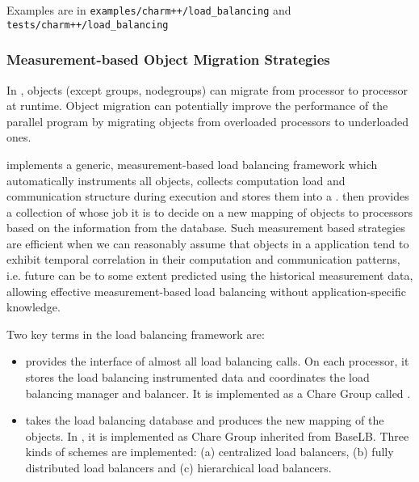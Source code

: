 Examples are in {\tt examples/charm++/load\_balancing} and {\tt
  tests/charm++/load\_balancing}
\subsubsection{Measurement-based Object Migration Strategies}

\label{lbFramework}
\label{migrationlb}

In \charmpp{}, objects (except groups, nodegroups) can migrate from 
processor to processor at runtime. Object migration can potentially 
improve the performance of the parallel program by migrating objects from 
overloaded processors to underloaded ones. 


 \charmpp{} implements a generic, measurement-based load balancing framework
which automatically instruments all \charmpp{} objects, collects computation
load and communication structure during execution and stores them into a
. \charmpp{} then provides a collection of  whose job it is to decide on a new mapping of objects to
processors based on the information from the database.  Such measurement based
strategies are efficient when we can reasonably assume that objects in a 
\charmpp{} application tend to exhibit temporal correlation in their
computation and communication patterns, i.e. future can be to some extent
predicted using the historical measurement data, allowing effective
measurement-based load balancing without application-specific knowledge.

Two key terms in the \charmpp{} load balancing framework are:
\begin{itemize}
%
\item {} provides the interface of almost all load
balancing calls. On each processor, it stores the load balancing instrumented
data and coordinates the load balancing manager and balancer. It is implemented
as a Chare Group called .
%
\item {} takes the load balancing database and
produces the new mapping of the objects. In \charmpp{}, it is implemented as
Chare Group inherited from BaseLB. Three kinds of schemes are implemented: (a)
centralized load balancers, (b) fully distributed load balancers and (c)
hierarchical load balancers.
%
\end{itemize}

